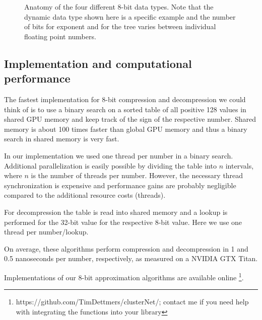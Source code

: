 \documentclass{article} %
\begin{document}
\begin{figure}[h]
	\begin{center}
	\end{center}
	\caption{Anatomy of the four different 8-bit data types. Note that the dynamic data type shown here is a specific example and the number of bits for exponent and for the tree varies between individual floating point numbers.}
\end{figure}

\subsection{Implementation and computational performance}

The fastest implementation for 8-bit compression and decompression we could think of is to use a binary search on a sorted table of all positive 128 values in shared GPU memory and keep track of the sign of the respective number. Shared memory is about 100 times faster than global GPU memory and thus a binary search in shared memory is very fast. 

In our implementation we used one thread per number in a binary search. Additional parallelization is easily possible by dividing the table into $n$ intervals, where $n$ is the number of threads per number. However, the necessary thread synchronization is expensive and performance gains are probably negligible compared to the additional resource costs (threads). 

For decompression the table is read into shared memory and a lookup is performed for the 32-bit value for the respective 8-bit value. Here we use one thread per number/lookup.

On average, these algorithms perform compression and decompression in 1 and 0.5 nanoseconds per number, respectively, as measured on a NVIDIA GTX Titan.

Implementations of our 8-bit approximation algorithms are available online \footnote{https://github.com/TimDettmers/clusterNet/; contact me if you need help with integrating the functions into your library}.
\end{document}

